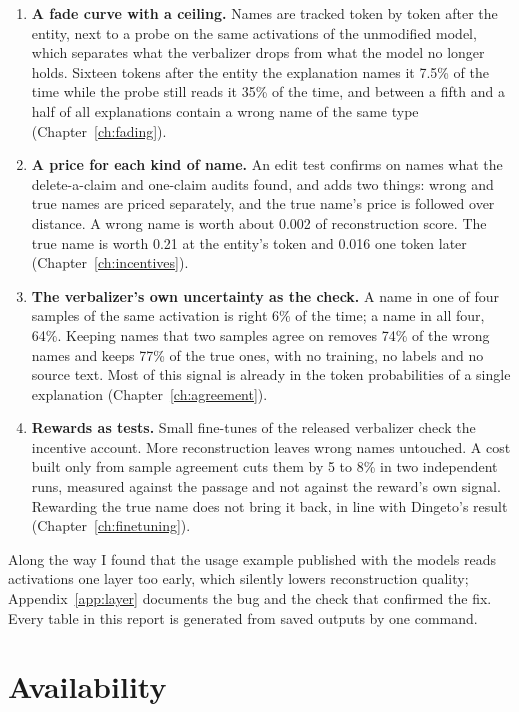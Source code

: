 \begin{enumerate}
\item \textbf{A fade curve with a ceiling.} Names are tracked token by token after the entity, next to a probe
on the same activations of the unmodified model, which separates what the verbalizer drops from what the
model no longer holds. Sixteen tokens after the entity the explanation names it 7.5\% of the time while the
probe still reads it 35\% of the time, and between a fifth and a half of all explanations contain a wrong
name of the same type (Chapter~\ref{ch:fading}).

\item \textbf{A price for each kind of name.} An edit test confirms on names what the delete-a-claim and
one-claim audits found, and adds two things: wrong and true names are priced separately, and the true name's
price is followed over distance. A wrong name is worth about 0.002 of reconstruction score. The true name is
worth 0.21 at the entity's token and 0.016 one token later (Chapter~\ref{ch:incentives}).

\item \textbf{The verbalizer's own uncertainty as the check.} A name in one of four samples of the same
activation is right 6\% of the time; a name in all four, 64\%. Keeping names that two samples agree on removes
74\% of the wrong names and keeps 77\% of the true ones, with no training, no labels and no source text. Most
of this signal is already in the token probabilities of a single explanation
(Chapter~\ref{ch:agreement}).

\item \textbf{Rewards as tests.} Small fine-tunes of the released verbalizer check the incentive account. More
reconstruction leaves wrong names untouched. A cost built only from sample agreement cuts them by 5 to 8\%
in two independent runs, measured against the passage and not against the reward's own signal. Rewarding the
true name does not bring it back, in line with Dingeto's result (Chapter~\ref{ch:finetuning}).
\end{enumerate}

Along the way I found that the usage example published with the models reads activations one layer too early,
which silently lowers reconstruction quality; Appendix~\ref{app:layer} documents the bug and the check that confirmed the
fix. Every table in this report is
generated from saved outputs by one command.

\section{Availability}
\label{sec:availability}

